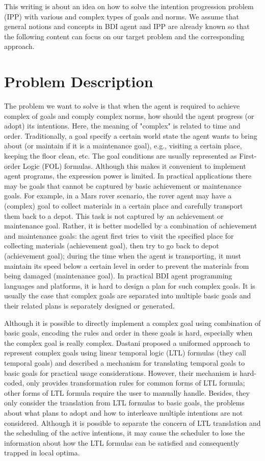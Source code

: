 \documentclass{article}
\begin{document}
This writing is about an idea on how to solve the intention progression problem (IPP) with various and complex types of goals and norms. We assume that general notions and concepts in BDI agent and IPP are already known so that the following content can focus on our target problem and the corresponding approach.
\section*{Problem Description}
The problem we want to solve is that when the agent is required to achieve complex of goals and comply complex norms, how should the agent progress (or adopt) its intentions. Here, the meaning of "complex" is related to time and order.
%
Traditionally, a goal specify a certain world state the agent wants to bring about (or maintain if it is a maintenance goal), e.g., visiting a certain place, keeping the floor clean, etc. The goal conditions are usually represented as First-order Logic (FOL) formulas. Although this makes it convenient to implement agent programs, the expression power is limited. In practical applications there may be goals that cannot be captured by basic achievement or maintenance goals. For example, in a Mars rover scenario, the rover agent may have a (complex) goal to collect materials in a certain place and carefully transport them back to a depot. This task is not captured by an achievement or maintenance goal. Rather, it is better modelled by a combination of achievement and maintenance goals: the agent first tries to visit the specified place for collecting materials (achievement goal), then try to go back to depot (achievement goal); during the time when the agent is transporting, it must maintain its speed below a certain level in order to prevent the materials from being damaged (maintenance goal). In practical BDI agent programming languages and platforms, it is hard to design a plan for such complex goals. It is usually the case that complex goals are separated into multiple basic goals and their related plans is separately designed or generated.

%
Although it is possible to directly implement a complex goal using combination of basic goals, encoding the rules and order in these goals is hard, especially when the complex goal is really complex. Dastani\cite{DBLP:conf/atal/DastaniRW11} proposed a uniformed approach to represent complex goals using linear temporal logic (LTL) formulas (they call temporal goals) and described a mechanism for translating temporal goals to basic goals for practical usage considerations. However, their mechanism is hard-coded, only provides transformation rules for common forms of LTL formula; other forms of LTL formula require the user to manually handle. Besides, they only consider the translation from LTL formulas to basic goals, the problems about what plans to adopt and how to interleave multiple intentions are not considered. Although it is possible to separate the concern of LTL translation and the scheduling of the active intentions, it may cause the scheduler to lose the information about how the LTL formulas can be satisfied and consequently trapped in local optima.
\end{document}
